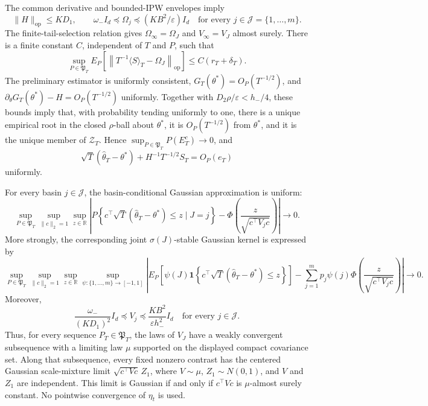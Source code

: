 The common derivative and bounded-IPW envelopes imply
\[
 \|H\|_{\mathrm{op}}\le KD_1,
 \qquad
 \omega_-I_d\preceq\Omega_j\preceq(KB^2/\varepsilon)I_d
 \quad\text{for every }j\in\mathcal J=\{1,\ldots,m\}.
\]
The finite-tail-selection relation gives \(\Omega_\infty=\Omega_J\) and \(V_\infty=V_J\) almost surely. There is a finite constant \(C\), independent of \(T\) and \(P\), such that
\[
 \sup_{P\in\mathfrak P_T}E_P\!\left[
 \left\|T^{-1}\langle S\rangle_T-\Omega_J\right\|_{\mathrm{op}}\right]
 \le C(r_T+\delta_T).
\]
The preliminary estimator is uniformly consistent, \(G_T(\theta^*)=O_P(T^{-1/2})\), and \(\partial_\theta G_T(\theta^*)-H=O_P(T^{-1/2})\) uniformly. Together with \(D_2\rho/\varepsilon<h_-/4\), these bounds imply that, with probability tending uniformly to one, there is a unique empirical root in the closed \(\rho\)-ball about \(\theta^*\), it is \(O_P(T^{-1/2})\) from \(\theta^*\), and it is the unique member of \(\mathcal Z_T\). Hence \(\sup_{P\in\mathfrak P_T}P(E_T^c)\to0\), and
\[
 \sqrt T(\widehat\theta_T-\theta^*)+H^{-1}T^{-1/2}S_T=O_P(e_T)
\]
uniformly.

For every basin \(j\in\mathcal J\), the basin-conditional Gaussian approximation is uniform:
\[
 \sup_{P\in\mathfrak P_T}\sup_{\|c\|_2=1}\sup_{z\in\mathbb R}
 \left|P\!\left\{c^\top\sqrt T(\widehat\theta_T-\theta^*)\le z\mid J=j\right\}
 -\Phi\!\left(\frac{z}{\sqrt{c^\top V_jc}}\right)\right|
 \longrightarrow0.
\]
More strongly, the corresponding joint \(\sigma(J)\)-stable Gaussian kernel is expressed by
\[
 \sup_{P\in\mathfrak P_T}\sup_{\|c\|_2=1}\sup_{z\in\mathbb R}
 \sup_{\psi:\{1,\ldots,m\}\to[-1,1]}
 \left|E_P\!\left[\psi(J)\mathbf1\!\left\{
 c^\top\sqrt T(\widehat\theta_T-\theta^*)\le z\right\}\right]
 -\sum_{j=1}^mp_j\psi(j)\Phi\!\left(\frac{z}{\sqrt{c^\top V_jc}}\right)\right|
 \longrightarrow0.
\]
Moreover,
\[
 \frac{\omega_-}{(KD_1)^2}I_d\preceq V_j
 \preceq\frac{KB^2}{\varepsilon h_-^2}I_d
 \quad\text{for every }j\in\mathcal J.
\]
Thus, for every sequence \(P_T\in\mathfrak P_T\), the laws of \(V_J\) have a weakly convergent subsequence with a limiting law \(\mu\) supported on the displayed compact covariance set. Along that subsequence, every fixed nonzero contrast has the centered Gaussian scale-mixture limit \(\sqrt{c^\top Vc}\,Z_1\), where \(V\sim\mu\), \(Z_1\sim N(0,1)\), and \(V\) and \(Z_1\) are independent. This limit is Gaussian if and only if \(c^\top Vc\) is \(\mu\)-almost surely constant. No pointwise convergence of \(\eta_t\) is used.